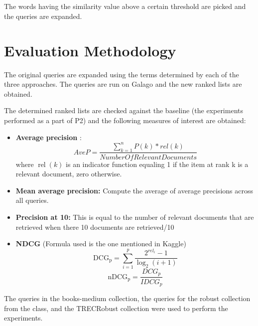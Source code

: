 \documentclass[a4paper, 12pt, notitlepage]{report}
\begin{document}
\paragraph{}
The words having the similarity value above a certain threshold are picked and the queries are expanded. 

\chapter{Evaluation Methodology}
The original queries are expanded using the terms determined by each of the three approaches. The queries are run on Galago \cite{galago} and the new ranked lists are obtained. 

The determined ranked lists are checked against the baseline (the experiments performed as a part of P2) and the following measures of interest are obtained:

\begin{itemize}
\item \textbf{Average precision} \cite{ir}:
\begin{equation*}
AveP = \frac{\sum_{k=1}^{n} P(k)*rel(k)}{NumberOfRelevantDocuments}
\end{equation*}
where $\operatorname{rel}(k)$ is an indicator function equaling 1 if the item at rank k is a relevant document, zero otherwise.

\item \textbf{Mean average precision:} Compute the average of average precisions across all queries.

\item \textbf{Precision at 10:} This is equal to the number of relevant documents that are retrieved when there 10 documents are retrieved/10

\item \textbf{NDCG} (Formula used is the one mentioned in Kaggle) \cite{ndcg}
\begin{equation*}
\mathrm{DCG_{p}} = \sum_{i=1}^{p} \frac{ 2^{rel_{i}} - 1 }{ \log_{2}(i+1)} 
\end{equation*}
\begin{equation*}
    \mathrm{nDCG_{p}} = \frac{DCG_{p}}{IDCG_{p}} 
\end{equation*}
    
\end{itemize}
The queries in the books-medium collection, the queries for the robust collection from the class, and the TRECRobust collection were used to perform the experiments.
\end{document}
